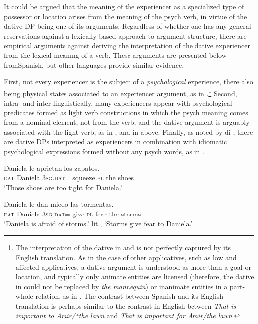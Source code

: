 \documentclass[output=paper,colorlinks,citecolor=brown,nonflat]{./langscibook}
\begin{document}
It could be argued that the meaning of the experiencer as a specialized type of possessor or location arises from the meaning of the psych verb, in virtue of the dative DP being one of its arguments. Regardless of whether one has any general reservations against a lexically-based approach to argument structure, there are empirical arguments against deriving the interpretation of the dative experiencer from the lexical meaning of a verb. These arguments are presented below fromSpanish, but other languages provide similar evidence.

First, not every experiencer is the subject of a \textit{psychological} experience, there also being physical states associated to an experiencer argument, as in .\footnote{The interpretation of the dative in  and  is not perfectly captured by its English translation. As in the case of other applicatives, such as low and affected applicatives, a dative argument is understood as more than a goal or location, and typically only animate entities are licensed (therefore, the dative in  could not be replaced by \textit{the mannequin}) or inanimate entities in a part-whole relation, as in . The contrast between Spanish  and its English translation is perhaps similar to the contrast in English between \textit{That is important to Amir/*the lawn} and \textit{That is important for Amir/the lawn}.} Second, intra- and inter-linguistically, many experiencers appear with psychological predicates formed as light verb constructions in which the psych meaning comes from a nominal element, not from the verb, and the dative argument is arguably associated with the light verb, as in , and in  above. Finally, as noted by di \citet{DiTullio2015}, there are dative DPs interpreted as experiencers in combination with idiomatic psychological expressions formed without any psych words, as in .

\ea%
    \label{ex:cuervo:16}
     {Daniela} {le}   {aprietan}  {los} {zapatos}.\\
    \textsc{dat} Daniela  3\textsc{sg.dat}= squeeze.\textsc{pl}   the shoes\\
    \glt ‘Those shoes are too tight for Daniela.’
    \z

\ea%
    \label{ex:cuervo:17}
     {Daniela} {le}   {dan}   {miedo}  {las} {tormentas}.\\
    \textsc{dat} Daniela  3\textsc{sg.dat}= give.\textsc{pl}  fear  the storms\\
    \glt ‘Daniela is afraid of storms.’ lit., ‘Storms give fear to Daniela.’
    \z
\end{document}

